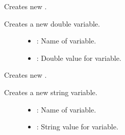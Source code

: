 \documentclass[letterpaper,10pt,english]{sphinxmanual}
\begin{document}
\begin{fulllineitems}
\begin{fulllineitems}
\end{fulllineitems}


\begin{fulllineitems}
\label{\detokenize{index:_CPPv2N7ostendo3Var3VarENSt6stringEd}}%
\pysigstartmultiline
{}\label{\detokenize{index:Pessumstructostendo_1_1Var_1a12e2c20b81280d34d13a77b39c57f96d}}%
\pysigstopmultiline
Creates new {\hyperref[\detokenize{index:Pessumstructostendo_1_1Var}]{}}. 

Creates a new double variable. \begin{description}
\item[{}] \leavevmode\begin{itemize}
\item {} 
: Name of variable. 

\item {} 
: Double value for variable. 

\end{itemize}

\end{description}


\end{fulllineitems}


\begin{fulllineitems}
\label{\detokenize{index:_CPPv2N7ostendo3Var3VarENSt6stringENSt6stringE}}%
\pysigstartmultiline
{}\label{\detokenize{index:Pessumstructostendo_1_1Var_1aa80859e63a7df5c1beab958e621637b8}}%
\pysigstopmultiline
Creates new {\hyperref[\detokenize{index:Pessumstructostendo_1_1Var}]{}}. 

Creates a new string variable. \begin{description}
\item[{}] \leavevmode\begin{itemize}
\item {} 
: Name of variable. 

\item {} 
: String value for variable. 


\end{itemize}
\end{description}
\end{fulllineitems}
\end{fulllineitems}
\end{document}

